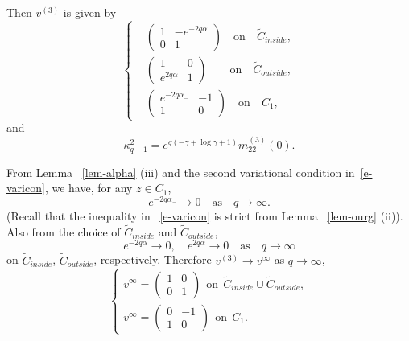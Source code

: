 \documentclass{amsart}
\theoremstyle{definition}
\theoremstyle{remark}
\numberwithin{equation}{section}
\newcommand{\wt}{\widetilde}
\begin{document}
Then $v^{(3)}$ is given by
\begin{equation*}
  \begin{cases}
     &\begin{pmatrix} 1&-e^{-2q\alpha}\\0&1 \end{pmatrix}
\quad\text{on}\quad \wt{C}_{inside},\\
     &\begin{pmatrix} 1&0\\e^{2q\alpha}&1 \end{pmatrix}
\qquad\text{on}\quad \wt{C}_{outside},\\
     &\begin{pmatrix} e^{-2q\alpha_-}&-1\\1&0 \end{pmatrix}
\quad\text{on}\quad C_1,
  \end{cases}
\end{equation*}
and 
\begin{equation}\label{e-Km3K2}
   \kappa^2_{q-1}=e^{q(-\gamma+\log \gamma+1)}m^{(3)}_{22}(0).
\end{equation}

From Lemma ~\ref{lem-alpha} (iii) and the second variational 
condition in~\eqref{e-varicon}, we have, for any $z\in C_1$,
\begin{equation*}
   e^{-2q\alpha_-}\to 0 \quad\text{as} \quad q\to\infty.
\end{equation*}
(Recall that the inequality in ~\eqref{e-varicon} is strict
from Lemma ~\ref{lem-ourg} (ii)).
Also from the choice of $\wt{C}_{inside}$ and $\wt{C}_{outside}$, 
\begin{equation*}
   e^{-2q\alpha}\to 0, \quad e^{2q\alpha}\to 0
\quad\text{as} \quad q\to\infty
\end{equation*}
on $\wt{C}_{inside}$, $\wt{C}_{outside}$, respectively.
Therefore $v^{(3)} \rightarrow v^\infty$ as $q\rightarrow \infty$,
\begin{equation}
\begin{cases}
v^\infty =
 \begin{pmatrix} 1&0\\0&1 \end{pmatrix} \ \ \text{on} \ \ 
\wt{C}_{inside}\cup\wt{C}_{outside},\\
v^\infty =
 \begin{pmatrix} 0&-1\\1&0 \end{pmatrix} \ \ \text{on} \ \ 
C_1.
\end{cases}
\end{equation} 
\end{document}
